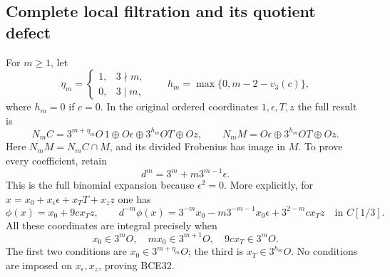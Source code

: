 \subsection{Complete local filtration and its quotient defect}

For \(m\ge1\), let
\[
\eta_m=\begin{cases}1,&3\nmid m,\\0,&3\mid m,\end{cases}
\qquad
h_m=\max\{0,m-2-v_3(c)\},
\]
where \(h_m=0\) if \(c=0\). In the original ordered
coordinates \(1,\epsilon,T,z\) the full result is
\begin{equation}\tag{BCE32}
N_mC=
3^{m+\eta_m}O\,1\oplus O\epsilon
\oplus3^{h_m}OT\oplus Oz,\qquad
N_mM=O\epsilon\oplus3^{h_m}OT\oplus Oz .
\end{equation}
Here \(N_mM=N_mC\cap M\), and its divided Frobenius has
image in \(M\). To prove every coefficient, retain
\begin{equation}\tag{BCE33}
d^m=3^m+m3^{m-1}\epsilon .
\end{equation}
This is the full binomial expansion because \(\epsilon^2=0\).
More explicitly, for
\(x=x_0+x_\epsilon\epsilon+x_TT+x_zz\) one has
\[
\phi(x)=x_0+9cx_Tz,\qquad
d^{-m}\phi(x)
=3^{-m}x_0-m3^{-m-1}x_0\epsilon+3^{2-m}cx_Tz
\quad\text{in }C[1/3].
\]
All these coordinates are integral precisely when
\[
x_0\in3^mO,\quad mx_0\in3^{m+1}O,\quad
9cx_T\in3^mO .
\]
The first two conditions are \(x_0\in3^{m+\eta_m}O\);
the third is \(x_T\in3^{h_m}O\). No conditions are imposed
on \(x_\epsilon,x_z\), proving BCE32.

